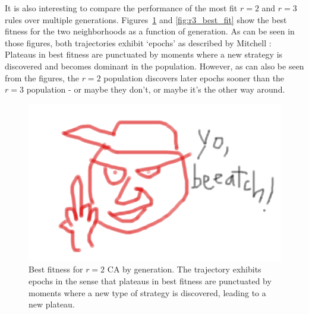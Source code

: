 It is also interesting to compare the performance of the most fit $r = 2$ and $r = 3$ rules over multiple generations. Figures~\ref{fig:r2_best_fit} and 
\ref{fig:r3_best_fit} show the best fitness for the two neighborhoods as a function of generation. As can be seen in those figures, both trajectories exhibit 
`epochs' as described by Mitchell \cite{Mitchell:1994:ECA:186092.186116}: Plateaus in best fitness are punctuated by moments where a new strategy 
is discovered and becomes dominant in the population. However, as can also be seen from the figures, the $r = 2$ population discovers later epochs sooner 
than the $r = 3$ population - or maybe they don't, or maybe it's the other way around.

\begin{figure}
\begin{center}
\includegraphics[width=\linewidth]{foo.png}
\caption{Best fitness for $r = 2$ CA by generation. The trajectory exhibits epochs in the sense that plateaus in best fitness are punctuated by moments 
where a new type of strategy is discovered, leading to a new plateau.}
\label{fig:r2_best_fit}
\end{center}
\end{figure}
